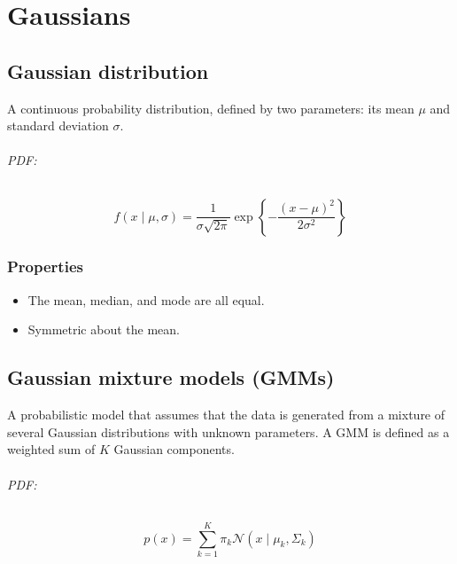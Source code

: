 
\part{Gaussians}

\chapter{Gaussian distribution}

A continuous probability distribution, defined by two parameters: its mean \( \mu \) and standard deviation \( \sigma \).

\paragraph{PDF:}
\begin{equation*}
    f(x \mid \mu, \sigma)
    =
    \frac{1}{\sigma \sqrt{2\pi}}
    \exp \left\{ -\frac{{(x - \mu)}^2}{2\sigma^2} \right\}
\end{equation*}

\section{Properties}

\begin{itemize}
    \item The mean, median, and mode are all equal.

    \item Symmetric about the mean.
\end{itemize}

\chapter{Gaussian mixture models (GMMs)}

A probabilistic model that assumes that the data is generated from a mixture of several Gaussian distributions with unknown parameters.
A GMM is defined as a weighted sum of \( K \) Gaussian components.

\paragraph{PDF:}
\begin{equation*}
    p(x)
    =
    \sum_{k=1}^{K} \pi_k \mathcal{N}(x \mid \mu_k, \Sigma_k)
\end{equation*}

